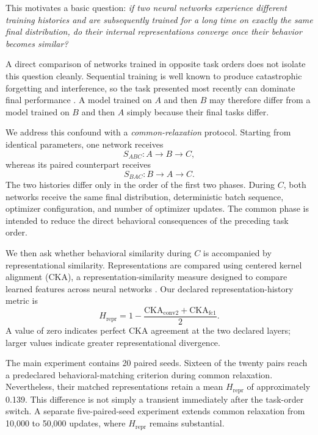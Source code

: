 \documentclass[11pt,a4paper]{article}
\newcommand{\hrepr}{H_{\mathrm{repr}}}
\newcommand{\sabc}{S_{ABC}}
\newcommand{\sbac}{S_{BAC}}
\begin{document}
This motivates a basic question: \emph{if two neural networks experience different training histories and are subsequently trained for a long time on exactly the same final distribution, do their internal representations converge once their behavior becomes similar?}

A direct comparison of networks trained in opposite task orders does not isolate this question cleanly. Sequential training is well known to produce catastrophic forgetting and interference, so the task presented most recently can dominate final performance \citep{goodfellow2013catastrophic,parisi2019continual}. A model trained on $A$ and then $B$ may therefore differ from a model trained on $B$ and then $A$ simply because their final tasks differ.

We address this confound with a \emph{common-relaxation} protocol. Starting from identical parameters, one network receives
\[
\sabc: A \rightarrow B \rightarrow C,
\]
whereas its paired counterpart receives
\[
\sbac: B \rightarrow A \rightarrow C.
\]
The two histories differ only in the order of the first two phases. During $C$, both networks receive the same final distribution, deterministic batch sequence, optimizer configuration, and number of optimizer updates. The common phase is intended to reduce the direct behavioral consequences of the preceding task order.

We then ask whether behavioral similarity during $C$ is accompanied by representational similarity. Representations are compared using centered kernel alignment (CKA), a representation-similarity measure designed to compare learned features across neural networks \citep{kornblith2019similarity}. Our declared representation-history metric is
\[
\hrepr = 1-\frac{\mathrm{CKA}_{\mathrm{conv2}}+\mathrm{CKA}_{\mathrm{fc1}}}{2}.
\]
A value of zero indicates perfect CKA agreement at the two declared layers; larger values indicate greater representational divergence.

The main experiment contains 20 paired seeds. Sixteen of the twenty pairs reach a predeclared behavioral-matching criterion during common relaxation. Nevertheless, their matched representations retain a mean $\hrepr$ of approximately 0.139. This difference is not simply a transient immediately after the task-order switch. A separate five-paired-seed experiment extends common relaxation from 10,000 to 50,000 updates, where $\hrepr$ remains substantial.
\end{document}
